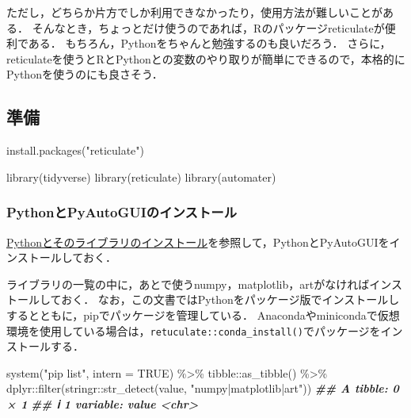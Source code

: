 \documentclass[
]{article}
\newenvironment{Shaded}{\begin{snugshade}}{\end{snugshade}}
\newcommand{\AttributeTok}[1]{\textcolor[rgb]{0.77,0.63,0.00}{#1}}
\newcommand{\ConstantTok}[1]{\textcolor[rgb]{0.00,0.00,0.00}{#1}}
\newcommand{\DocumentationTok}[1]{\textcolor[rgb]{0.56,0.35,0.01}{\textbf{\textit{#1}}}}
\newcommand{\FunctionTok}[1]{\textcolor[rgb]{0.00,0.00,0.00}{#1}}
\newcommand{\NormalTok}[1]{#1}
\newcommand{\SpecialCharTok}[1]{\textcolor[rgb]{0.00,0.00,0.00}{#1}}
\newcommand{\StringTok}[1]{\textcolor[rgb]{0.31,0.60,0.02}{#1}}
\begin{document}
ただし，どちらか片方でしか利用できなかったり，使用方法が難しいことがある．
そんなとき，ちょっとだけ使うのであれば，Rのパッケージreticulateが便利である．
もちろん，Pythonをちゃんと勉強するのも良いだろう．
さらに，reticulateを使うとRとPythonとの変数のやり取りが簡単にできるので，本格的にPythonを使うのにも良さそう．

\hypertarget{ux6e96ux5099-6}{%
\subsection{準備}\label{ux6e96ux5099-6}}

\begin{Shaded}
\begin{Highlighting}[]
\FunctionTok{install.packages}\NormalTok{(}\StringTok{"reticulate"}\NormalTok{)}
\end{Highlighting}
\end{Shaded}

\begin{Shaded}
\begin{Highlighting}[]
\FunctionTok{library}\NormalTok{(tidyverse)}
\FunctionTok{library}\NormalTok{(reticulate)}
\FunctionTok{library}\NormalTok{(automater)}
\end{Highlighting}
\end{Shaded}

\hypertarget{pythonux3068pyautoguiux306eux30a4ux30f3ux30b9ux30c8ux30fcux30eb}{%
\subsubsection{PythonとPyAutoGUIのインストール}\label{pythonux3068pyautoguiux306eux30a4ux30f3ux30b9ux30c8ux30fcux30eb}}

\protect\hyperlink{install_python}{Pythonとそのライブラリのインストール}を参照して，PythonとPyAutoGUIをインストールしておく．

ライブラリの一覧の中に，あとで使うnumpy，matplotlib，artがなければインストールしておく．
なお，この文書ではPythonをパッケージ版でインストールしするとともに，pipでパッケージを管理している．
Anacondaやminicondaで仮想環境を使用している場合は，\texttt{retuculate::conda\_install()}でパッケージをインストールする．

\begin{Shaded}
\begin{Highlighting}[]
\FunctionTok{system}\NormalTok{(}\StringTok{"pip list"}\NormalTok{, }\AttributeTok{intern =} \ConstantTok{TRUE}\NormalTok{) }\SpecialCharTok{\%\textgreater{}\%}
\NormalTok{  tibble}\SpecialCharTok{::}\FunctionTok{as\_tibble}\NormalTok{() }\SpecialCharTok{\%\textgreater{}\%}
\NormalTok{  dplyr}\SpecialCharTok{::}\FunctionTok{filter}\NormalTok{(stringr}\SpecialCharTok{::}\FunctionTok{str\_detect}\NormalTok{(value, }\StringTok{"numpy|matplotlib|art"}\NormalTok{))}
\DocumentationTok{\#\# A tibble: 0 × 1}
\DocumentationTok{\#\# ℹ 1 variable: value \textless{}chr\textgreater{}}
\end{Highlighting}
\end{Shaded}
\end{document}

